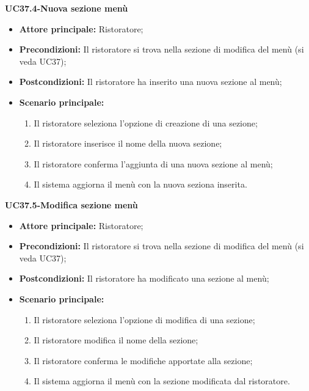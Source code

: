 \textbf{UC37.4-Nuova sezione menù}
\begin{itemize}
    \item \textbf{Attore principale:} Ristoratore;
    \item \textbf{Precondizioni:} Il ristoratore si trova nella sezione di modifica del menù (si veda UC37);
    \item \textbf{Postcondizioni:} Il ristoratore ha inserito una nuova sezione al menù;
    \item \textbf{Scenario principale:}
    \begin{enumerate}
        \item Il ristoratore seleziona l'opzione di creazione di una sezione;
        \item Il ristoratore inserisce il nome della nuova sezione;
        \item Il ristoratore conferma l'aggiunta di una nuova sezione al menù;
        \item Il sistema aggiorna il menù con la nuova seziona inserita.
    \end{enumerate}
\end{itemize}

\textbf{UC37.5-Modifica sezione menù}
\begin{itemize}
    \item \textbf{Attore principale:} Ristoratore;
    \item \textbf{Precondizioni:} Il ristoratore si trova nella sezione di modifica del menù (si veda UC37);
    \item \textbf{Postcondizioni:} Il ristoratore ha modificato una sezione al menù;
    \item \textbf{Scenario principale:}
    \begin{enumerate}
        \item Il ristoratore seleziona l'opzione di modifica di una sezione;
        \item Il ristoratore modifica il nome della sezione;
        \item Il ristoratore conferma le modifiche apportate alla sezione;
        \item Il sistema aggiorna il menù con la sezione modificata dal ristoratore.
    \end{enumerate}
\end{itemize}


